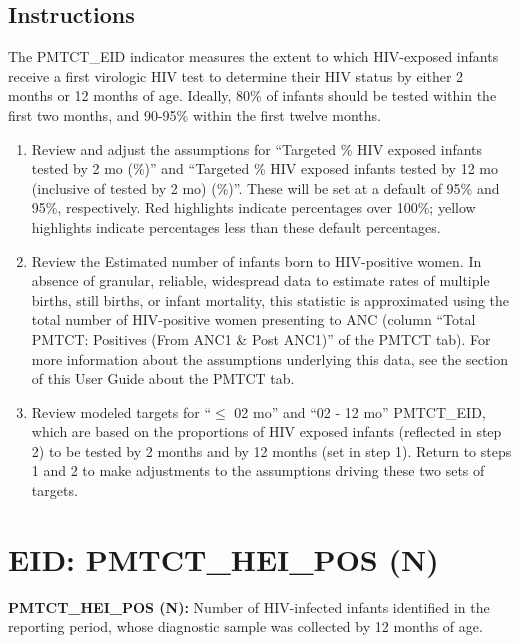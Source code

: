 \documentclass[
  openany]{book}
\begin{document}
\hypertarget{instructions-22}{%
\subsection{Instructions}\label{instructions-22}}

The PMTCT\_EID indicator measures the extent to which HIV-exposed infants receive a first virologic HIV test to determine their HIV status by either 2 months or 12 months of age. Ideally, 80\% of infants should be tested within the first two months, and 90-95\% within the first twelve months.

\begin{enumerate}
\def\labelenumi{\arabic{enumi}.}
\item
  Review and adjust the assumptions for ``Targeted \% HIV exposed infants tested by 2 mo (\%)'' and ``Targeted \% HIV exposed infants tested by 12 mo (inclusive of tested by 2 mo) (\%)''. These will be set at a default of 95\% and 95\%, respectively. Red highlights indicate percentages over 100\%; yellow highlights indicate percentages less than these default percentages.
\item
  Review the Estimated number of infants born to HIV-positive women. In absence of granular, reliable, widespread data to estimate rates of multiple births, still births, or infant mortality, this statistic is approximated using the total number of HIV-positive women presenting to ANC (column ``Total PMTCT: Positives (From ANC1 \& Post ANC1)'' of the PMTCT tab). For more information about the assumptions underlying this data, see the section of this User Guide about the PMTCT tab.
\item
  Review modeled targets for ``\(\leq\) 02 mo'' and ``02 - 12 mo'' PMTCT\_EID, which are based on the proportions of HIV exposed infants (reflected in step 2) to be tested by 2 months and by 12 months (set in step 1). Return to steps 1 and 2 to make adjustments to the assumptions driving these two sets of targets.
\end{enumerate}

\hypertarget{eid-pmtct_hei_pos-n}{%
\section{EID: PMTCT\_HEI\_POS (N)}\label{eid-pmtct_hei_pos-n}}

\textbf{PMTCT\_HEI\_POS (N):} Number of HIV-infected infants identified in the reporting period, whose diagnostic sample was collected by 12 months of age.
\end{document}
